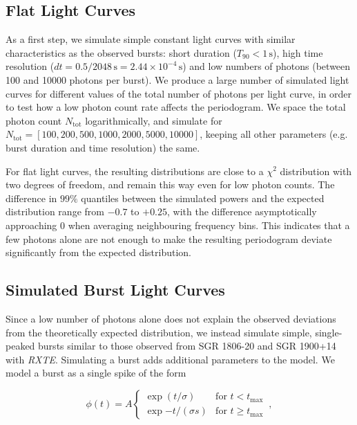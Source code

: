 \documentclass[numberedappendix]{emulateapj}
\newcommand{\project}[1]{\textsl{#1}}
\newcommand{\rxte}{\project{RXTE}}
\begin{document}
\subsection{Flat Light Curves}
\label{sec:analysis_lcsims}
As a first step, we simulate simple constant light curves with similar characteristics as the observed bursts: short duration ($T_{90} < 1 \, \mathrm{s}$), high time resolution ($dt = 0.5/2048 \, \mathrm{s} = 2.44\times 10^{-4} \, \mathrm{s}$) and low numbers of photons (between 100 and 10000 photons per burst). 
We produce a large number of simulated light curves for different values of the total number of photons per light curve, in order to test how a low photon count rate affects the periodogram. We space the total photon count $N_{\mathrm{tot}}$ logarithmically, and simulate for $N_{\mathrm{tot}} = [100, 200, 500, 1000, 2000, 5000, 10000]$, keeping all other parameters (e.g. burst duration and time resolution) the same.


For flat light curves, the resulting distributions are close to a $\chi^2$ distribution with two degrees of freedom, and remain this way even for low photon counts. The difference in $99\%$ quantiles between the simulated powers and the expected distribution range from $-0.7$ to $+0.25$, with the difference asymptotically approaching $0$ when averaging neighbouring frequency bins.
This indicates that a few photons alone are not enough to make the resulting periodogram deviate significantly from the expected distribution.



\subsection{Simulated Burst Light Curves}
\label{sec:weakburstsims}



Since a low number of photons alone does not explain the observed deviations from the theoretically expected distribution, we instead simulate simple, single-peaked bursts similar to those observed from SGR 1806-20 and SGR 1900+14 with \rxte.
Simulating a burst adds additional parameters to the model. We model a burst as a single spike of the form

\begin{equation}
\phi(t) = A \left\{\begin{array}{ll}\exp(t/\sigma) & \mbox{for $t<t_\mathrm{max}$}\\ \exp{-t/(\sigma s)} & \mbox{for $t\geq t_{\mathrm{max}}$}\end{array}\right. \, ,
\label{eqn:spikemodel}
\end{equation}
\end{document}
